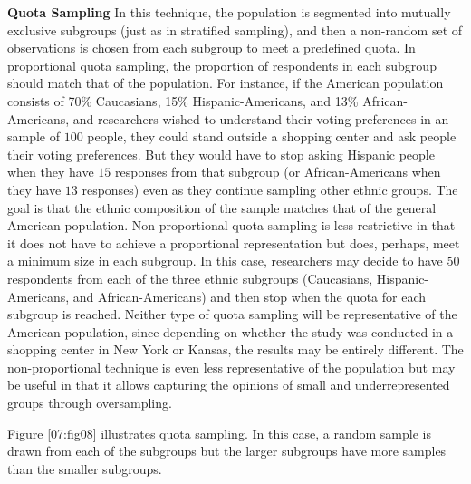 \textbf{Quota Sampling} In this technique, the population is segmented into mutually exclusive subgroups (just as in stratified sampling), and then a non-random set of observations is chosen from each subgroup to meet a predefined quota. In proportional quota sampling, the proportion of respondents in each subgroup should match that of the population. For instance, if the American population consists of 70\% Caucasians, 15\% Hispanic-Americans, and 13\% African-Americans, and researchers wished to understand their voting preferences in an sample of $ 100 $ people, they could stand outside a shopping center and ask people their voting preferences. But they would have to stop asking Hispanic people when they have $ 15 $ responses from that subgroup (or African-Americans when they have $ 13 $ responses) even as they continue sampling other ethnic groups. The goal is that the ethnic composition of the sample matches that of the general American population. Non-proportional quota sampling is less restrictive in that it does not have to achieve a proportional representation but does, perhaps, meet a minimum size in each subgroup. In this case, researchers may decide to have $ 50 $ respondents from each of the three ethnic subgroups (Caucasians, Hispanic-Americans, and African-Americans) and then stop when the quota for each subgroup is reached. Neither type of quota sampling will be representative of the American population, since depending on whether the study was conducted in a shopping center in New York or Kansas, the results may be entirely different. The non-proportional technique is even less representative of the population but may be useful in that it allows capturing the opinions of small and underrepresented groups through oversampling.

Figure \ref{07:fig08} illustrates quota sampling. In this case, a random sample is drawn from each of the subgroups but the larger subgroups have more samples than the smaller subgroups.

